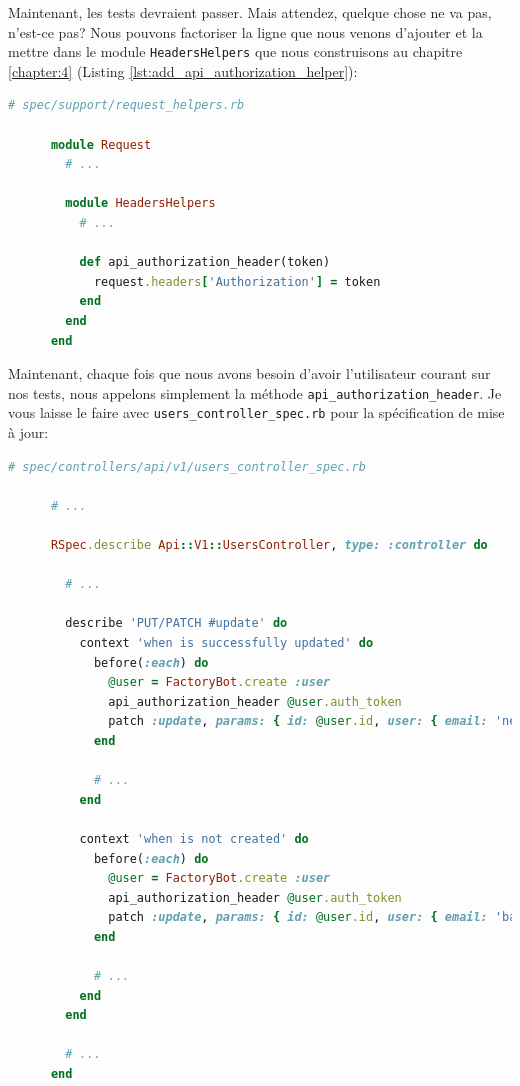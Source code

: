 \documentclass[]{report}
\begin{document}
    Maintenant, les tests devraient passer. Mais attendez, quelque chose ne va pas, n'est-ce pas? Nous pouvons factoriser la ligne que nous venons d'ajouter et la mettre dans le module \verb|HeadersHelpers| que nous construisons au chapitre \ref{chapter:4} (Listing \ref{lst:add_api_authorization_helper}):

    \begin{scriptsize}
      \begin{lstlisting}[language=ruby, label={lst:add_api_authorization_helper}, caption={Factorisation de l'initialisation de l'en-tête Authorization}]
      # spec/support/request_helpers.rb

      module Request
        # ...

        module HeadersHelpers
          # ...

          def api_authorization_header(token)
            request.headers['Authorization'] = token
          end
        end
      end
      \end{lstlisting}
    \end{scriptsize}

    Maintenant, chaque fois que nous avons besoin d'avoir l'utilisateur courant sur nos tests, nous appelons simplement la méthode \verb|api_authorization_header|. Je vous laisse le faire avec \verb|users_controller_spec.rb| pour la spécification de mise à jour:

    \begin{scriptsize}
      \begin{lstlisting}[language=ruby]
      # spec/controllers/api/v1/users_controller_spec.rb

      # ...

      RSpec.describe Api::V1::UsersController, type: :controller do

        # ...

        describe 'PUT/PATCH #update' do
          context 'when is successfully updated' do
            before(:each) do
              @user = FactoryBot.create :user
              api_authorization_header @user.auth_token
              patch :update, params: { id: @user.id, user: { email: 'newmail@example.com' } }, format: :json
            end

            # ...
          end

          context 'when is not created' do
            before(:each) do
              @user = FactoryBot.create :user
              api_authorization_header @user.auth_token
              patch :update, params: { id: @user.id, user: { email: 'bademail.com' } }, format: :json
            end

            # ...
          end
        end

        # ...
      end
      \end{lstlisting}
    \end{scriptsize}
\end{document}
